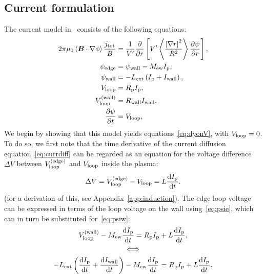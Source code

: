 \documentclass{notes}
\newcommand{\Ip}{I_{\rm p}}
\newcommand{\Iw}{I_{\rm wall}}
\newcommand{\Vl}{V_{\rm loop}}
\newcommand{\Vle}{\Vl^{({\rm edge})}}
\newcommand{\Vlw}{\Vl^{({\rm wall})}}
\newcommand{\Rp}{R_{\rm p}}
\newcommand{\psie}{\psi_{\rm edge}}
\newcommand{\psiw}{\psi_{\rm wall}}
\begin{document}
    \subsection{Current formulation}
    The current model in \DREAM\ consists of the following equations:
    \begin{subequations}
        \begin{align}
            2\pi\mu_0\left\langle\bb{B}\cdot\nabla\phi\right\rangle
            \frac{j_{\rm tot}}{B} &= \frac{1}{V'}\frac{\partial}{\partial r}\left[
                V'\left\langle\frac{\left|\nabla r\right|^2}{R^2}\right\rangle
                \frac{\partial\psi}{\partial r}
            \right],\label{eq:currdiff}\\
            \psie &= \psiw - M_{\rm ew} \Ip,\label{eq:psie}\\
            \psiw &= -L_{\rm ext}\left(\Ip + \Iw\right),\label{eq:psiw}\\
            \Vl &= \Rp\Ip,\label{eq:RpIp}\\
            \Vlw &= R_{\rm wall}\Iw,\label{eq:RwIw}\\
            \frac{\partial\psi}{\partial t} &= \Vl,
        \end{align}
    \end{subequations}
    We begin by showing that this model yields equations~\eqref{eq:dyonV}, with
    $\Vl=0$. To do so, we first note that the time derivative of the current
    diffusion equation~\eqref{eq:currdiff} can be regarded as an equation for
    the voltage difference $\Delta V$ between $\Vle$ and $\Vl$ inside the
    plasma:
    \begin{equation}
        \Delta V = \Vle-\Vl = L\frac{\dd\Ip}{\dd t}.
    \end{equation}
    (for a derivation of this, see Appendix~\ref{app:induction}).
    The edge loop voltage can be expressed in terms of the loop voltage on the
    wall using~\eqref{eq:psie}, which can in turn be substituted
    for~\eqref{eq:psiw}:
    \begin{equation}
        \begin{gathered}
            \Vlw-M_{\rm ew}\frac{\dd\Ip}{\dd t} = \Rp\Ip + L\frac{\dd\Ip}{\dd t},\\
            \Longleftrightarrow\\
            -L_{\rm ext}\left(\frac{\dd\Ip}{\dd t} + \frac{\dd I_{\rm wall}}{\dd t}\right)
            -M_{\rm ew}\frac{\dd\Ip}{\dd t} = \Rp\Ip + L\frac{\dd\Ip}{\dd t}.
        \end{gathered}
    \end{equation}
\end{document}

